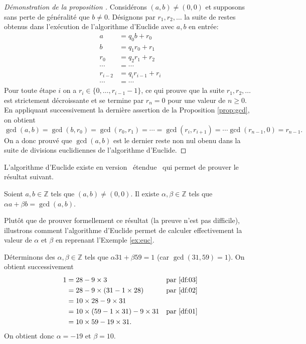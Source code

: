 \documentclass[french,course,oneside,theoremnosection]{lecture}
\newcommand{\Z}{\mathbb{Z}}
\begin{document}
\begin{proof}[Démonstration de la proposition \label{prop:algoeucl}]
Considérons $(a,b) \neq (0,0)$ et supposons sans perte de généralité que $b\neq 0$. Désignons par $r_1, r_2, \ldots $ la suite de restes  obtenus dans l'exécution de l'algorithme d'Euclide avec $a,b$ en entrée:
{\setlength{\jot}{2pt}
\begin{align*}
a &= q_0b+r_0\\
b& = q_1 r_0 +r_1\\
r_0 &= q_2 r_1 +r_2\\
\cdots &= \cdots\\
r_{i-2}&= q_i r_{i-1} + r_i\\
\cdots &= \cdots
\end{align*}}
Pour toute étape $i$ on a $r_i\in\{0, \ldots, r_{i-1}-1\}$, ce qui prouve que la suite $r_1, r_2, \ldots$ est strictement décroissante et se termine par $r_{n} = 0$ pour une valeur de $ n\geq 0$.
En appliquant successivement la dernière assertion de la Proposition \ref{prop:gcd}, on obtient
\[
\gcd(a,b)=\gcd(b,r_0)= \gcd(r_0, r_1)= \cdots = \gcd(r_i, r_{i+1}) = \cdots \gcd(r_{n-1}, 0) = r_{n-1}.
\]
On a donc prouvé que $\gcd(a,b)$ est le dernier reste non nul obenu dans la suite de divisions euclidiennes de l’algorithme d'Euclide.
\end{proof}

L'algorithme d'Euclide existe en version \og~étendue~\fg{} qui permet de prouver le résultat suivant.
\begin{theorem}[Bezout]
Soient $a, b \in \Z$ tels que $(a,b)\neq (0,0)$. Il existe $\alpha, \beta \in \Z$ tels que $\alpha a +  \beta b = \gcd(a,b)$.
\end{theorem}
Plutôt que de prouver formellement ce résultat (la preuve n'est pas difficile), illustrons comment l'algorithme d'Euclide permet de calculer effectivement la valeur de $\alpha$ et $\beta$ en reprenant l'Exemple \ref{ex:euc}.
\begin{example}\label{ex:bezout}
Déterminons  des $\alpha, \beta \in \Z$ tels que $\alpha 31 + \beta 59=1$ (car $\gcd(31,59)=1$). On obtient successivement
{\setlength{\jot}{2pt}
\begin{align*}
1 & = 28 - 9 \times 3  & \text{par \eqref{df:03}}\\
 & = 28 -9 \times (31-1\times 28) &\text{par \eqref{df:02}}\\
 & = 10\times 28 - 9 \times 31\\
 & = 10 \times (59-1\times 31) -9 \times 31 &  \text{par \eqref{df:01}}\\
 & = 10 \times 59 -19 \times 31.
\end{align*}}
On obtient donc $\alpha = -19$ et $\beta = 10$.
\end{example}
\end{document}
